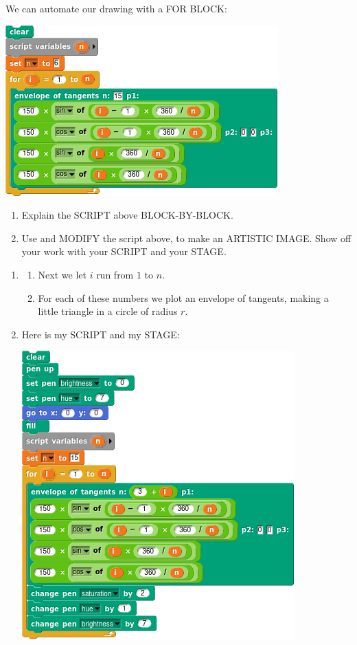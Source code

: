\documentclass[noauthor,nooutcomes,12pt,hints,handout]{ximera}
\begin{document}
\begin{question}
  We can automate our drawing with a FOR BLOCK:
  \begin{center}
    \includegraphics{forEnvTan.png}
  \end{center}
  \begin{enumerate}
  \item Explain the SCRIPT above BLOCK-BY-BLOCK.
  \item Use and MODIFY the script above, to make an ARTISTIC
    IMAGE. Show off your work with your SCRIPT and your STAGE.
  \end{enumerate}
  \begin{freeResponse}
    \begin{enumerate}
    \item \begin{enumerate} We start by making a variable called $n$,
      and we set it to $6$.
    \item Next we let $i$ run from $1$ to $n$.
    \item For each of these numbers we plot an envelope of tangents,
      making a little triangle in a circle of radius $r$.
    \end{enumerate}
    \item Here is my SCRIPT and my STAGE:
      \begin{center}
    \includegraphics[width=.3\textwidth]{lineArtisticScript.png}\qquad{}
  \end{center}
    \end{enumerate}
  \end{freeResponse}
\end{question}
\end{document}
